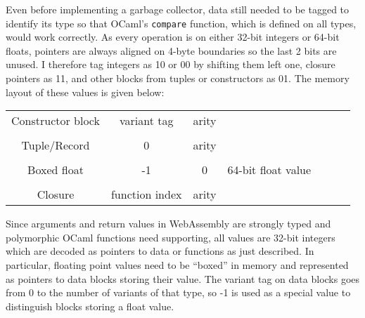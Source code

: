 
Even before implementing a garbage collector, data still needed to be tagged to identify its type so that OCaml's \verb|compare| function, which is defined on all types, would work correctly. As every operation is on either 32-bit integers or 64-bit floats, pointers are always aligned on 4-byte boundaries so the last 2 bits are unused. I therefore tag integers as 10 or 00 by shifting them left one, closure pointers as 11, and other blocks from tuples or constructors as 01. The memory layout of these values is given below:

  \begin{tabular}{c|c|c|c|c|c|m{2cm}|} \cline{2-7}
Constructor block &   variant tag  & arity &   \multicolumn{3}{c}{\hspace{2cm}{elements} } &  \\ \cline{2-7} \multicolumn{1}{c}{}  \\ \cline{2-7}
Tuple/Record &   0  & arity &   \multicolumn{3}{c}{\hspace{2cm}{elements}} &  \\ \cline{2-7} \multicolumn{1}{c}{}  \\ \cline{2-4}
Boxed float &  -1 & 0 & 64-bit float value      \\ \cline{2-4} \multicolumn{1}{c}{}  \\ \cline{2-7}
Closure & function index  & arity &   \multicolumn{3}{c}{\hspace{2cm}{free variables}} &  \\ \cline{2-7} 
\end{tabular}

Since arguments and return values in WebAssembly are strongly typed and polymorphic OCaml functions need supporting, all values are 32-bit integers which are decoded as pointers to data or functions as just described. In particular, floating point values need to be ``boxed'' in memory and represented as pointers to data blocks storing their value. The variant tag on data blocks goes from 0 to the number of variants of that type, so -1 is used as a special value to distinguish blocks storing a float value.

